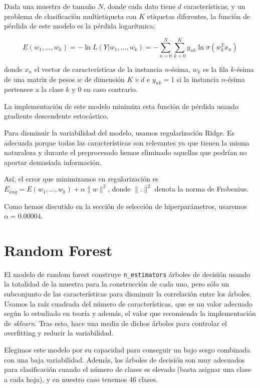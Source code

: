\documentclass[a4]{article}
\begin{document}
Dada una muestra de tamaño $N$, donde cada dato tiene $d$
características, y un problema de clasificación multietiqueta con $K$
etiquetas diferentes, la función de pérdida de este modelo es la
pérdida logarítmica:

\[ E(w_1, \ldots, w_k) = -\ln L(Y|w_1, \ldots, w_k) = -\sum\limits_{n=0}^{N}\sum\limits_{k=0}^{K} y_{nk}\ln \sigma (w^T_kx_n)\]

donde $x_n$ el vector de características de la instancia $n$-ésima,
$w_k$ es la fila $k$-ésima de una matriz de pesos $w$ de dimensión
$K \times d$ e $y_{nk} = 1$ si la instancia $n$-ésima pertenece a la
clase $k$ y $0$ en caso contrario.

La implementación de este modelo minimiza esta función de pérdida
usando gradiente descendente estocástico.

Para disminuir la variabilidad del modelo, usamos regularización
Ridge. Es adecuada porque todas las características son relevantes ya
que tienen la misma naturaleza y durante el preprocesado hemos
eliminado aquellas que podrían no aportar demasiada información.

Así, el error que minimizamos en regularización es
$E_{aug} = E(w_1, \ldots, w_k) + \alpha \|w\|^2$, donde $\|.\|^2$
denota la norma de Frobenius.

Como hemos discutido en la sección de selección de hiperparámetros,
usaremos $\alpha = 0.00004$.

\section{Random Forest}

El modelo de random forest construye \texttt{n\_estimators} árboles de
decisión usando la totalidad de la muestra para la construcción de
cada uno, pero sólo un subconjunto de las características para
disminuir la correlación entre los árboles. Usamos la raíz cuadrada
del número de características, que es un valor adecuado según lo
estudiado en teoría y además, el valor que recomienda la
implementación de \textit{sklearn}. Tras esto, hace una media de
dichos árboles para controlar el overfitting y reducir la
variabilidad.

Elegimos este modelo por su capacidad para conseguir un bajo sesgo
combinada con una baja variabilidad. Además, los árboles de decisión
son muy adecuados para clasificación cuando el número de clases es
elevado (basta asignar una clase a cada hoja), y en nuestro caso
tenemos 46 clases.
\end{document}

